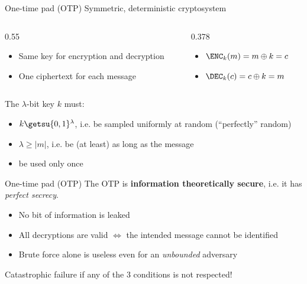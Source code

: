 \begin{frame}{One-time pad (OTP)}
  Symmetric, deterministic cryptosystem
  \begin{columns}[T]
    \begin{column}{0.55\textwidth}
      \pause
      \begin{itemize}
        \item Same key for encryption and decryption
        \item One ciphertext for each message
      \end{itemize}
    \end{column}
    \begin{column}{0.378\textwidth}
      \pause
      \begin{itemize}
        \item $\ENC_k(m) = m \oplus k = c$
        \item $\DEC_k(c) = c \oplus k = m$
      \end{itemize}
    \end{column}
  \end{columns}

  \vspace*{1em}

  \pause
  The $\lambda$-bit key $k$ must:
  \begin{itemize}[<+(1)->]
    \item $k \getsu \{0,1\}^\lambda$, i.e. be sampled uniformly at random (\enquote{perfectly} random)
    \item $\lambda \ge \lvert m\rvert$, i.e. be (at least) as long as the message 
    \item be used only once
  \end{itemize}
\end{frame}

\begin{frame}{One-time pad (OTP)}
  The OTP is \textbf{information theoretically secure}, i.e. it has \emph{perfect secrecy}.
  \begin{itemize}[<+(1)->]
    \item No bit of information is leaked
    \item All decryptions are valid $\iff$ the intended message cannot be identified
    \item Brute force alone is useless even for an \emph{unbounded} adversary
  \end{itemize}

  \vspace*{1em}

  \pause
  \begin{center}
    {\color{red} Catastrophic failure if any of the 3 conditions is not respected!}
  \end{center}
\end{frame}


